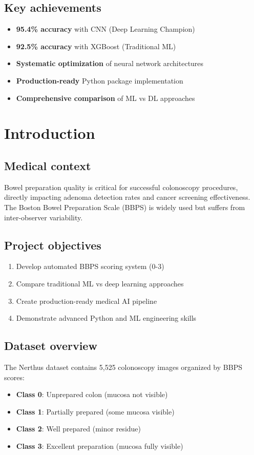 \documentclass[11pt]{article}
\begin{document}
\subsection{Key achievements}
\begin{itemize}
    \item \textbf{95.4\% accuracy} with CNN (Deep Learning Champion)
    \item \textbf{92.5\% accuracy} with XGBoost (Traditional ML)
    \item \textbf{Systematic optimization} of neural network architectures
    \item \textbf{Production-ready} Python package implementation
    \item \textbf{Comprehensive comparison} of ML vs DL approaches
\end{itemize}

\section{Introduction}

\subsection{Medical context}
Bowel preparation quality is critical for successful colonoscopy procedures, directly impacting adenoma detection rates and cancer screening effectiveness. The Boston Bowel Preparation Scale (BBPS) is widely used but suffers from inter-observer variability.

\subsection{Project objectives}
\begin{enumerate}
    \item Develop automated BBPS scoring system (0-3)
    \item Compare traditional ML vs deep learning approaches
    \item Create production-ready medical AI pipeline
    \item Demonstrate advanced Python and ML engineering skills
\end{enumerate}

\subsection{Dataset overview}
The Nerthus dataset contains 5,525 colonoscopy images organized by BBPS scores:
\begin{itemize}
    \item \textbf{Class 0}: Unprepared colon (mucosa not visible)
    \item \textbf{Class 1}: Partially prepared (some mucosa visible)
    \item \textbf{Class 2}: Well prepared (minor residue)
    \item \textbf{Class 3}: Excellent preparation (mucosa fully visible)
\end{itemize}
\end{document}
